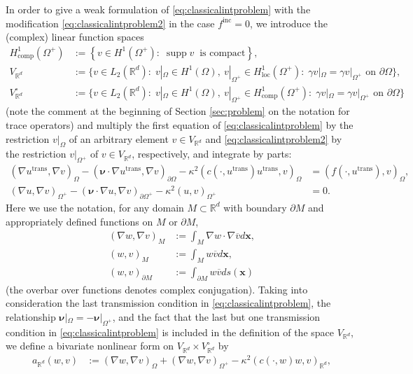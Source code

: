 \documentclass[12pt,DIV=14]{scrartcl}
\providecommand{\R}{\mathbb{R}}
\providecommand{\supp}{\operatorname{supp}}
\providecommand{\Om}{\Omega}
\providecommand{\pOm}{{\partial\Omega}}
\providecommand{\vecx}{\boldsymbol{x}}
\providecommand{\vecnu}{\boldsymbol{\nu}}
\begin{document}
In order to give a weak formulation of \eqref{eq:classicalintproblem} with
the modification \eqref{eq:classicalintproblem2} in the case $f^\mathrm{inc}=0$,
we introduce the (complex) linear function spaces
\begin{align*}
H^1_\mathrm{comp}(\Om^+) &:= \left\{v\in H^1(\Om^+):
\;\supp v\ \text{ is compact}\right\},\\
V_{\R^d} &:= \{v\in L_2(\R^d):\; v|_\Om\in H^1(\Om),\ v|_{\Om^+}\in H^1_\mathrm{loc}(\Om^+):
\;\gamma v|_\Om = \gamma v|_{\Om^+} \text{ on }\pOm\},\\
V_{\R^d}^\circ &:= \{v\in L_2(\R^d):\; v|_\Om\in H^1(\Om),\ v|_{\Om^+}\in H^1_\mathrm{comp}(\Om^+):
\;\gamma v|_\Om = \gamma v|_{\Om^+} \text{ on }\pOm\}
\end{align*}
(note the comment at the beginning of Section \ref{sec:problem} on the notation for trace operators)
and multiply the first equation of \eqref{eq:classicalintproblem} by the restriction
$v|_\Om$ of an arbitrary element $v\in V_{\R^d}$ and \eqref{eq:classicalintproblem2}
by the restriction $v|_{\Om^+}$ of $v\in V_{\R^d}$, respectively, and integrate by parts:
\begin{align*}
(\nabla u^\mathrm{trans},\nabla v)_\Om - (\vecnu\cdot\nabla u^\mathrm{trans},\nabla v)_{\pOm}
- \kappa^2(c(\cdot,u^\mathrm{trans}) u^\mathrm{trans},v)_\Om
&=(f(\cdot,u^\mathrm{trans}),v)_\Om,\\
(\nabla u,\nabla v)_{\Om^+} - (\vecnu\cdot\nabla u,\nabla v)_{\partial\Om^+} - \kappa^2(u,v)_{\Om^+}
&=0.
\end{align*}
Here we use the notation, for any domain $M\subset\R^d$ with boundary $\partial M$
and appropriately defined functions on $M$ or $\partial M$,
\begin{align*}
(\nabla w,\nabla v)_M &:= \int_M \nabla w\cdot\nabla\overline{v} d\vecx,\\
(w,v)_M &:= \int_M w\overline{v} d\vecx,\\
(w,v)_{\partial M} &:= \int_{\partial M} w\overline{v} ds(\vecx)
\end{align*}
(the overbar over functions denotes complex conjugation).
Taking into consideration the last transmission condition in \eqref{eq:classicalintproblem},
the relationship $\vecnu|_\Om = - \vecnu|_{\Om^+}$, and the fact that the last but one
transmission condition in \eqref{eq:classicalintproblem} is included in the definition of
the space $V_{\R^d}$, we define a bivariate nonlinear form on
$V_{\R^d}\times V_{\R^d}^\circ$ by
\begin{align*}
a_{\R^d}(w,v)
&:=(\nabla w,\nabla v)_\Om + (\nabla w,\nabla v)_{\Om^+} - \kappa^2(c(\cdot,w) w,v)_{\R^d},
\end{align*}
\end{document}
